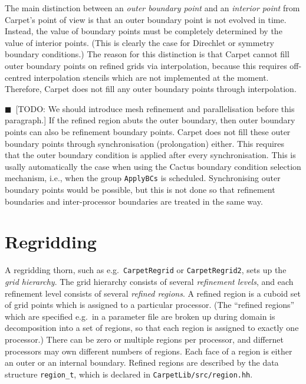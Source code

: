 \documentclass[oneside]{amsart}
\newcommand{\todo}[1]{{\color{blue}$\blacksquare$~\textsf{[TODO: #1]}}}
\newcommand{\code}[1]{\texttt{#1}}
\begin{document}
The main distinction between an \emph{outer boundary point} and an
\emph{interior point} from Carpet's point of view is that an outer
boundary point is not evolved in time.  Instead, the value of boundary
points must be completely determined by the value of interior points.
(This is clearly the case for Direchlet or symmetry boundary
conditions.)  The reason for this distinction is that Carpet cannot
fill outer boundary points on refined grids via interpolation, because
this requires off-centred interpolation stencils which are not
implemented at the moment.  Therefore, Carpet does not fill any outer
boundary points through interpolation.

\todo{We should introduce mesh refinement and parallelisation before
  this paragraph.}
%
If the refined region abuts the outer boundary, then outer boundary
points can also be refinement boundary points.  Carpet does not fill
these outer boundary points through synchronisation (prolongation)
either.  This requires that the outer boundary condition is applied
after every synchronisation.  This is usally automatically the case
when using the Cactus boundary condition selection mechanism, i.e.,
when the group \texttt{ApplyBCs} is scheduled.  Synchronising outer
boundary points would be possible, but this is not done so that
refinement boundaries and inter-processor boundaries are treated in
the same way.



\section{Regridding}

A regridding thorn, such as e.g.\ \texttt{CarpetRegrid} or
\texttt{CarpetRegrid2}, sets up the \emph{grid hierarchy}.  The grid
hierarchy consists of several \emph{refinement levels}, and each
refinement level consists of several \emph{refined regions}.  A
refined region is a cuboid set of grid points which is assigned to a
particular processor.  (The ``refined regions'' which are specified
e.g.\ in a parameter file are broken up during domain is decomposition
into a set of regions, so that each region is assigned to exactly one
processor.)  There can be zero or multiple regions per processor, and
differnet processors may own different numbers of regions.  Each face
of a region is either an outer or an internal boundary.  Refined
regions are described by the data structure \code{region\_t}, which is
declared in \code{CarpetLib/src/region.hh}.
\end{document}
